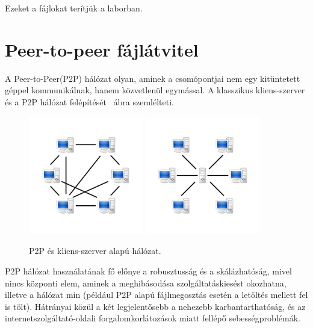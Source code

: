 Ezeket a fájlokat terítjük a laborban.
\section{Peer-to-peer fájlátvitel} 
\label{sect:p2p}
A Peer-to-Peer(P2P) hálózat olyan, aminek a csomópontjai nem egy kitüntetett géppel 
kommunikálnak, hanem közvetlenül egymással. A klasszikus kliens-szerver és a P2P hálózat felépítését
~ábra szemlélteti.

\begin{figure}[ht]
	\centering
	\includegraphics[width=50mm, keepaspectratio]{figures/P2P-network.png}\hspace{1cm}
	\includegraphics[width=50mm, keepaspectratio]{figures/Server-based-network.png}
	\caption{P2P és kliens-szerver alapú hálózat.}%
	\label{fig:networkcomparison}
\end{figure}

P2P hálózat használatának fő előnye a robusztusság és a skálázhatóság, mivel nincs központi elem,
aminek a meghibásodása szolgáltatáskiesést okozhatna, illetve a hálózat min (például P2P alapú fájlmegosztás esetén a letöltés mellett fel is tölt). Hátrányai közül a két legjelentősebb a nehezebb karbantarthatóság, és az internetszolgáltató-oldali forgalomkorlátozások miatt fellépő sebességproblémák.


